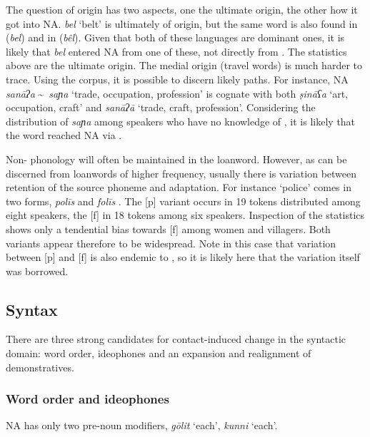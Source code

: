 \documentclass[output=paper]{langsci/langscibook}
\begin{document}
The question of origin has two aspects, one the ultimate origin, the other how it got into NA. \textit{bel} ‘belt’ is ultimately of  origin, but the same word is also found in  (\textit{bel}) and in  (\textit{bêl}). Given that both of these languages are dominant ones, it is likely that \textit{bel} entered NA from one of these, not directly from . The statistics above are the ultimate origin. The medial origin (travel words) is much harder to trace. Using the corpus, it is possible to discern likely paths. For instance, NA \textit{sanāʔa} {\textasciitilde}~\textit{saɲa} ‘trade, occupation, profession’ is {cognate} with both   \textit{ṣināʕa} ‘art, occupation, craft’ and  \textit{sanāʔā} `trade, craft, profession'. Considering the distribution of \textit{saɲa} among speakers who have no knowledge of  , it is likely that the word reached NA via .

Non- phonology will often be maintained in the {loanword}. However, as can be discerned from {loanwords} of higher {frequency}, usually there is variation between retention of the source {phoneme} and adaptation. For instance ‘police’ comes in two forms, \textit{polīs} and \textit{folīs} \citep[278]{Owens2000article}. The [p] variant occurs in 19 tokens distributed among eight speakers, the [f] in 18 tokens among six speakers. Inspection of the statistics shows only a tendential bias towards [f] among women and villagers. Both variants appear therefore to be widespread. Note in this case that variation between [p] and [f] is also endemic to , so it is likely here that the variation itself was borrowed.

\subsection{Syntax}

There are three strong candidates for contact-induced change in the syntactic domain: {word order}, {ideophones} and an expansion and realignment of {demonstratives}.\largerpage[-2]

\subsubsection{Word order and ideophones}

NA has only two pre-noun modifiers, \textit{gōlit} ‘each’, \textit{kunni} ‘each’.
\end{document}
